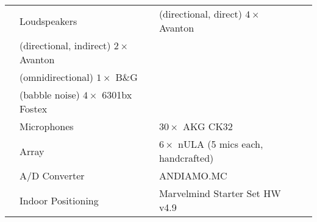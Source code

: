 \begin{tabular*}{\linewidth}{@{}llll@{}}
    \toprule
        & Loudspeakers   & (directional, direct) $4 \times$ Avanton\\
                    & (directional, indirect) $2 \times$ Avanton\\
                    & (omnidirectional) $1 \times$ B\&G\\
                    & (babble noise) $4 \times$ 6301bx Fostex&\\
        \hline
        & Microphones    & $30 \times$ AKG CK32 &\\
        & Array          & $6 \times$ nULA (5 mics each, handcrafted) &\\
        \hline
        & A/D Converter  & ANDIAMO.MC &\\
        \hline
        & Indoor Positioning & Marvelmind Starter Set HW v4.9 &\\
        \bottomrule
\end{tabular*}